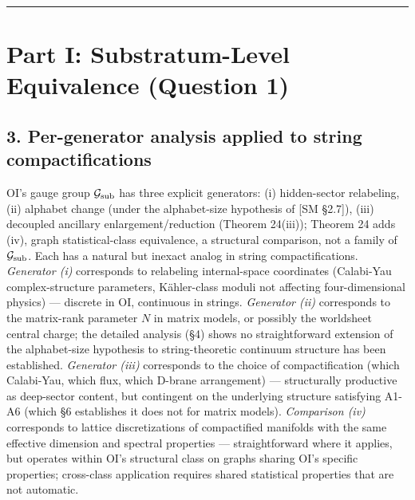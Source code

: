 \documentclass[
]{article}
\begin{document}
\begin{center}\rule{0.5\linewidth}{0.5pt}\end{center}

\hypertarget{part-i-substratum-level-equivalence-question-1}{%
\section{Part I: Substratum-Level Equivalence (Question
1)}\label{part-i-substratum-level-equivalence-question-1}}

\hypertarget{per-generator-analysis-applied-to-string-compactifications}{%
\subsection{3. Per-generator analysis applied to string
compactifications}\label{per-generator-analysis-applied-to-string-compactifications}}

OI's gauge group \(\mathcal{G}_{\rm sub}\) has three explicit
generators: (i) hidden-sector relabeling, (ii) alphabet change (under
the alphabet-size hypothesis of {[}SM §2.7{]}), (iii) decoupled
ancillary enlargement/reduction (Theorem 24(iii)); Theorem 24 adds (iv),
graph statistical-class equivalence, a structural comparison, not a
family of \(\mathcal{G}_{\rm sub}\). Each has a natural but inexact
analog in string compactifications. \emph{Generator (i)} corresponds to
relabeling internal-space coordinates (Calabi-Yau complex-structure
parameters, Kähler-class moduli not affecting four-dimensional physics)
--- discrete in OI, continuous in strings. \emph{Generator (ii)}
corresponds to the matrix-rank parameter \(N\) in matrix models, or
possibly the worldsheet central charge; the detailed analysis (§4) shows
no straightforward extension of the alphabet-size hypothesis to
string-theoretic continuum structure has been established.
\emph{Generator (iii)} corresponds to the choice of compactification
(which Calabi-Yau, which flux, which D-brane arrangement) ---
structurally productive as deep-sector content, but contingent on the
underlying structure satisfying A1-A6 (which §6 establishes it does not
for matrix models). \emph{Comparison (iv)} corresponds to lattice
discretizations of compactified manifolds with the same effective
dimension and spectral properties --- straightforward where it applies,
but operates within OI's structural class on graphs sharing OI's
specific properties; cross-class application requires shared statistical
properties that are not automatic.
\end{document}
